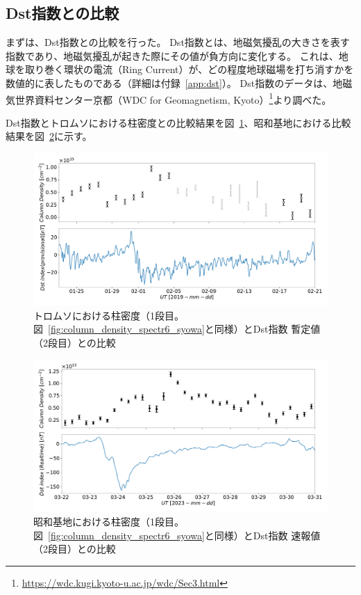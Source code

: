 \subsection{Dst指数との比較}
\label{ssec:comparison_dst}
まずは、Dst指数との比較を行った。
Dst指数とは、地磁気擾乱の大きさを表す指数であり、地磁気擾乱が起きた際にその値が負方向に変化する。
これは、地球を取り巻く環状の電流（Ring Current）が、どの程度地球磁場を打ち消すかを数値的に表したものである（詳細は付録~\ref{app:dst}）。
Dst指数のデータは、地磁気世界資料センター京都（WDC for Geomagnetism, Kyoto）\footnote{\url{https://wdc.kugi.kyoto-u.ac.jp/wdc/Sec3.html}}より調べた。\par
Dst指数とトロムソにおける柱密度との比較結果を図~\ref{fig:dst_mmcd_tromsoe}、昭和基地における比較結果を図~\ref{fig:dst_mmcd_syowa}に示す。
\begin{figure}[htbp]
    \centering
    \includegraphics[width=\linewidth]{master_thesis_contents/master_thesis_fig/dst_tromsoe_mmcd.pdf}
    \caption{トロムソにおける柱密度（1段目。図~\ref{fig:column_density_spectr6_syowa}と同様）とDst指数 暫定値（2段目）との比較}
    \label{fig:dst_mmcd_tromsoe}
\end{figure}
\begin{figure}[htbp]
    \centering
    \includegraphics[width=\linewidth]{master_thesis_contents/master_thesis_fig/column_density_spectr6_dst_syowa.pdf}
    \caption{昭和基地における柱密度（1段目。図~\ref{fig:column_density_spectr6_syowa}と同様）とDst指数 速報値（2段目）との比較}
    \label{fig:dst_mmcd_syowa}
\end{figure}
